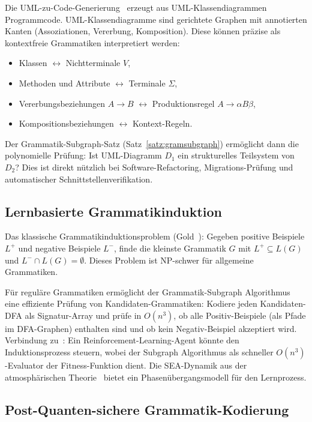 ﻿\documentclass[a4paper,12pt]{article}
\theoremstyle{definition}
\begin{document}
Die UML-zu-Code-Generierung~\cite{epp2026umlp} erzeugt aus UML-Klassendiagrammen
Programmcode. UML-Klassendiagramme sind gerichtete Graphen mit annotierten
Kanten (Assoziationen, Vererbung, Komposition). Diese k\"onnen pr\"azise als
kontextfreie Grammatiken interpretiert werden:
\begin{itemize}
    \item Klassen $\leftrightarrow$ Nichtterminale $V$,
    \item Methoden und Attribute $\leftrightarrow$ Terminale $\Sigma$,
    \item Vererbungsbeziehungen $A \to B$ $\leftrightarrow$ Produktionsregel $A \to \alpha B \beta$,
    \item Kompositionsbeziehungen $\leftrightarrow$ Kontext-Regeln.
\end{itemize}
Der Grammatik-Subgraph-Satz (Satz~\ref{satz:gramsubgraph}) erm\"oglicht dann
die polynomielle Pr\"ufung: Ist UML-Diagramm $D_1$ ein strukturelles Teilsystem
von $D_2$? Dies ist direkt n\"utzlich bei Software-Refactoring, Migrations-Pr\"ufung
und automatischer Schnittstellenverifikation.

\subsection{Lernbasierte Grammatikinduktion}

Das klassische Grammatikinduktionsproblem (Gold~\cite{gold1967}): Gegeben positive
Beispiele $L^+$ und negative Beispiele $L^-$, finde die kleinste Grammatik
$G$ mit $L^+ \subseteq L(G)$ und $L^- \cap L(G) = \emptyset$.
Dieses Problem ist NP-schwer f\"ur allgemeine Grammatiken.

F\"ur regul\"are Grammatiken erm\"oglicht der Grammatik-Subgraph Algorithmus
eine effiziente Pr\"ufung von Kandidaten-Grammatiken: Kodiere jeden Kandidaten-DFA
als Signatur-Array und pr\"ufe in $O(n^3)$, ob alle Positiv-Beispiele
(als Pfade im DFA-Graphen) enthalten sind und ob kein Negativ-Beispiel akzeptiert
wird. Verbindung zu~\cite{epp2026hetnet}: Ein Reinforcement-Learning-Agent
k\"onnte den Induktionsprozess steuern, wobei der Subgraph Algorithmus als
schneller $O(n^3)$-Evaluator der Fitness-Funktion dient.
Die SEA-Dynamik aus der atmosph\"arischen Theorie~\cite{epp2026klima}
bietet ein Phasen\"ubergangsmodell f\"ur den Lernprozess.

\subsection{Post-Quanten-sichere Grammatik-Kodierung}
\end{document}
